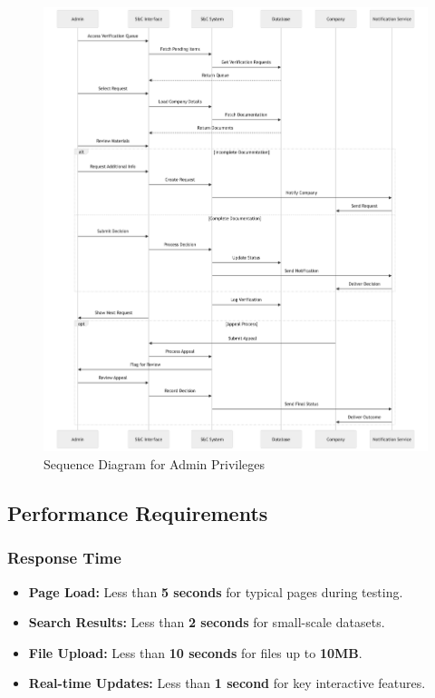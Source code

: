 \begin{figure}[H]
    \begin{center}
        \includegraphics[width=1\linewidth]{JhaBhatiaSharma/Images/Sequence Diagrams/AdminPriviliges.png}
        \caption{Sequence Diagram for Admin Privileges}
        \label{fig:adminPrivileges}%
    \end{center}
\end{figure}
\newpage

\subsection{Performance Requirements}
\label{subsec:performance_requirements}

\subsubsection*{Response Time}
\begin{itemize}
    \item \textbf{Page Load:} Less than \textbf{5 seconds} for typical pages during testing.
    \item \textbf{Search Results:} Less than \textbf{2 seconds} for small-scale datasets.
    \item \textbf{File Upload:} Less than \textbf{10 seconds} for files up to \textbf{10MB}.
    \item \textbf{Real-time Updates:} Less than \textbf{1 second} for key interactive features.
\end{itemize}

